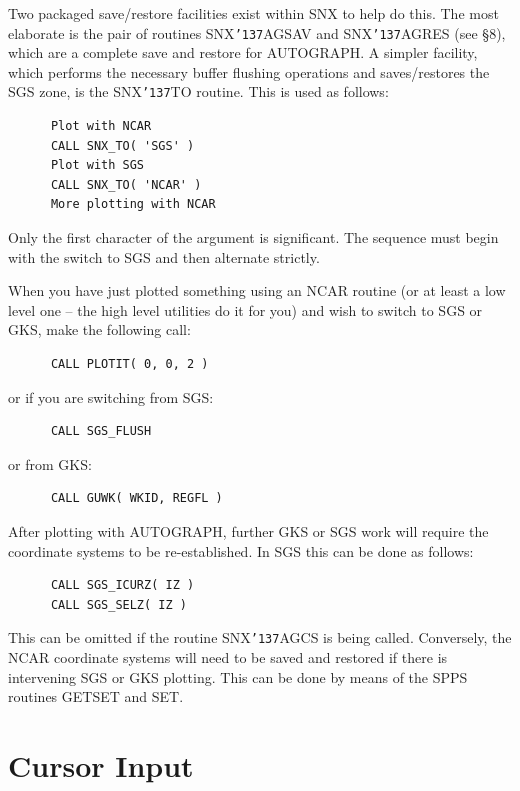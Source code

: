 \documentclass[11pt]{article}
\renewcommand{\_}{{\tt\char'137}}     %
\begin{document}
Two packaged save/restore facilities exist within SNX to help
do this.
The most elaborate is the pair of routines SNX\_AGSAV and SNX\_AGRES
(see \S 8), which are a complete save and restore for AUTOGRAPH.
A simpler facility, which performs the
necessary buffer flushing operations and saves/restores the
SGS zone, is the SNX\_TO routine.
This is used as follows:

\begin{verbatim}
      Plot with NCAR
      CALL SNX_TO( 'SGS' )
      Plot with SGS
      CALL SNX_TO( 'NCAR' )
      More plotting with NCAR
\end{verbatim}

Only the first character of the argument is significant.
The sequence must begin with the switch to SGS and then alternate strictly.

When you have just plotted something using an NCAR
routine (or at least a low level one -- the high level utilities do it
for you) and wish to switch to SGS or GKS, make the following call:

\begin{verbatim}
      CALL PLOTIT( 0, 0, 2 )
\end{verbatim}

or if you are switching from SGS:

\begin{verbatim}
      CALL SGS_FLUSH
\end{verbatim}

or from GKS:

\begin{verbatim}
      CALL GUWK( WKID, REGFL )
\end{verbatim}

After plotting with AUTOGRAPH, further GKS or SGS work will
require the coordinate systems to be re-established.
In SGS this can be done as follows:

\begin{verbatim}
      CALL SGS_ICURZ( IZ )
      CALL SGS_SELZ( IZ )
\end{verbatim}

This can be omitted if the routine SNX\_AGCS is being called.
Conversely, the NCAR coordinate systems will need to be saved and
restored if there is intervening SGS or GKS plotting.
This can be done by means of the SPPS routines
GETSET and SET.


\section {Cursor Input}
\end{document}
